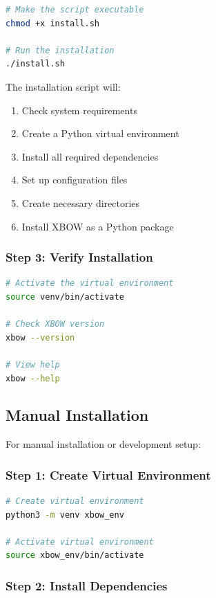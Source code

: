 \documentclass[12pt,a4paper]{report}
\begin{document}
\begin{lstlisting}[language=bash]
# Make the script executable
chmod +x install.sh

# Run the installation
./install.sh
\end{lstlisting}

The installation script will:

\begin{enumerate}
    \item Check system requirements
    \item Create a Python virtual environment
    \item Install all required dependencies
    \item Set up configuration files
    \item Create necessary directories
    \item Install XBOW as a Python package
\end{enumerate}

\subsubsection{Step 3: Verify Installation}

\begin{lstlisting}[language=bash]
# Activate the virtual environment
source venv/bin/activate

# Check XBOW version
xbow --version

# View help
xbow --help
\end{lstlisting}

\subsection{Manual Installation}

For manual installation or development setup:

\subsubsection{Step 1: Create Virtual Environment}

\begin{lstlisting}[language=bash]
# Create virtual environment
python3 -m venv xbow_env

# Activate virtual environment
source xbow_env/bin/activate
\end{lstlisting}

\subsubsection{Step 2: Install Dependencies}
\end{document}

